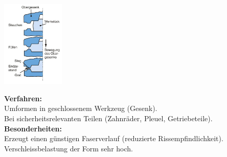 \begin{minipage}{0.49\linewidth}
    \includegraphics[width = 30mm]{src/images/Gesenkschmieden.png}
\end{minipage}
\begin{minipage}{0.49\linewidth}
    \textbf{Verfahren:}\\
    Umformen in geschlossenem Werkzeug (Gesenk).\\
    Bei sicherheitsrelevanten Teilen (Zahnräder, Pleuel, Getriebeteile). \\
    
    \textbf{Besonderheiten:}\\
    Erzeugt einen günstigen Faserverlauf (reduzierte Rissempfindlichkeit).\\
    Verschleissbelastung der Form sehr hoch.\\
    
\end{minipage}
